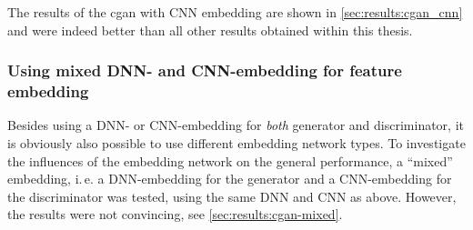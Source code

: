 The results of the \acrshort{cgan} with CNN embedding are shown in \cref{sec:results:cgan_cnn} 
and were indeed better than all other results obtained within this thesis.

\subsubsection{Using mixed DNN- and CNN-embedding for feature embedding}
Besides using a DNN- or CNN-embedding for \emph{both} generator and discriminator, it is obviously also possible
to use different embedding network types.
To investigate the influences of the embedding network on the general performance,
a ``mixed'' embedding, i.\,e. a DNN-embedding for the generator and a CNN-embedding for the discriminator was tested,
using the same DNN and CNN as above.
However, the results were not convincing, see \cref{sec:results:cgan-mixed}.










